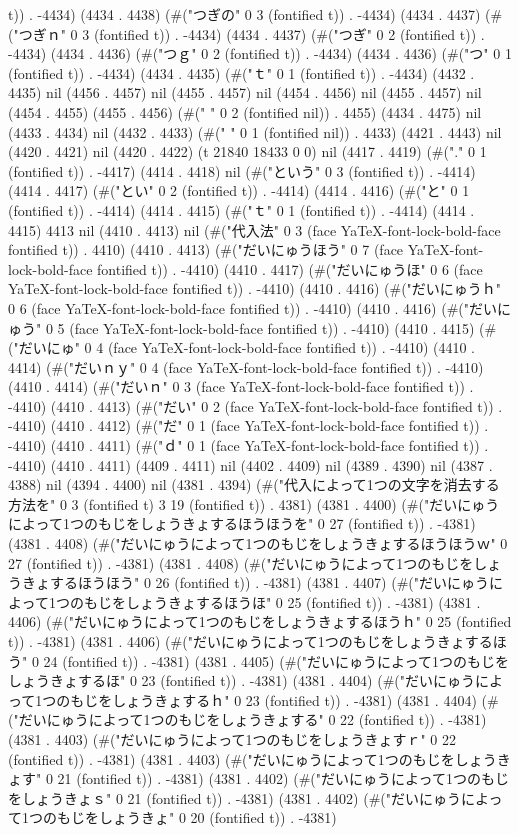 t)) . -4434) (4434 . 4438) (#("つぎの" 0 3 (fontified t)) . -4434) (4434 . 4437) (#("つぎｎ" 0 3 (fontified t)) . -4434) (4434 . 4437) (#("つぎ" 0 2 (fontified t)) . -4434) (4434 . 4436) (#("つｇ" 0 2 (fontified t)) . -4434) (4434 . 4436) (#("つ" 0 1 (fontified t)) . -4434) (4434 . 4435) (#("ｔ" 0 1 (fontified t)) . -4434) (4432 . 4435) nil (4456 . 4457) nil (4455 . 4457) nil (4454 . 4456) nil (4455 . 4457) nil (4454 . 4455) (4455 . 4456) (#("  " 0 2 (fontified nil)) . 4455) (4434 . 4475) nil (4433 . 4434) nil (4432 . 4433) (#(" " 0 1 (fontified nil)) . 4433) (4421 . 4443) nil (4420 . 4421) nil (4420 . 4422) (t 21840 18433 0 0) nil (4417 . 4419) (#("." 0 1 (fontified t)) . -4417) (4414 . 4418) nil (#("という" 0 3 (fontified t)) . -4414) (4414 . 4417) (#("とい" 0 2 (fontified t)) . -4414) (4414 . 4416) (#("と" 0 1 (fontified t)) . -4414) (4414 . 4415) (#("ｔ" 0 1 (fontified t)) . -4414) (4414 . 4415) 4413 nil (4410 . 4413) nil (#("代入法" 0 3 (face YaTeX-font-lock-bold-face fontified t)) . 4410) (4410 . 4413) (#("だいにゅうほう" 0 7 (face YaTeX-font-lock-bold-face fontified t)) . -4410) (4410 . 4417) (#("だいにゅうほ" 0 6 (face YaTeX-font-lock-bold-face fontified t)) . -4410) (4410 . 4416) (#("だいにゅうｈ" 0 6 (face YaTeX-font-lock-bold-face fontified t)) . -4410) (4410 . 4416) (#("だいにゅう" 0 5 (face YaTeX-font-lock-bold-face fontified t)) . -4410) (4410 . 4415) (#("だいにゅ" 0 4 (face YaTeX-font-lock-bold-face fontified t)) . -4410) (4410 . 4414) (#("だいｎｙ" 0 4 (face YaTeX-font-lock-bold-face fontified t)) . -4410) (4410 . 4414) (#("だいｎ" 0 3 (face YaTeX-font-lock-bold-face fontified t)) . -4410) (4410 . 4413) (#("だい" 0 2 (face YaTeX-font-lock-bold-face fontified t)) . -4410) (4410 . 4412) (#("だ" 0 1 (face YaTeX-font-lock-bold-face fontified t)) . -4410) (4410 . 4411) (#("ｄ" 0 1 (face YaTeX-font-lock-bold-face fontified t)) . -4410) (4410 . 4411) (4409 . 4411) nil (4402 . 4409) nil (4389 . 4390) nil (4387 . 4388) nil (4394 . 4400) nil (4381 . 4394) (#("代入によって1つの文字を消去する方法を" 0 3 (fontified t) 3 19 (fontified t)) . 4381) (4381 . 4400) (#("だいにゅうによって1つのもじをしょうきょするほうほうを" 0 27 (fontified t)) . -4381) (4381 . 4408) (#("だいにゅうによって1つのもじをしょうきょするほうほうｗ" 0 27 (fontified t)) . -4381) (4381 . 4408) (#("だいにゅうによって1つのもじをしょうきょするほうほう" 0 26 (fontified t)) . -4381) (4381 . 4407) (#("だいにゅうによって1つのもじをしょうきょするほうほ" 0 25 (fontified t)) . -4381) (4381 . 4406) (#("だいにゅうによって1つのもじをしょうきょするほうｈ" 0 25 (fontified t)) . -4381) (4381 . 4406) (#("だいにゅうによって1つのもじをしょうきょするほう" 0 24 (fontified t)) . -4381) (4381 . 4405) (#("だいにゅうによって1つのもじをしょうきょするほ" 0 23 (fontified t)) . -4381) (4381 . 4404) (#("だいにゅうによって1つのもじをしょうきょするｈ" 0 23 (fontified t)) . -4381) (4381 . 4404) (#("だいにゅうによって1つのもじをしょうきょする" 0 22 (fontified t)) . -4381) (4381 . 4403) (#("だいにゅうによって1つのもじをしょうきょすｒ" 0 22 (fontified t)) . -4381) (4381 . 4403) (#("だいにゅうによって1つのもじをしょうきょす" 0 21 (fontified t)) . -4381) (4381 . 4402) (#("だいにゅうによって1つのもじをしょうきょｓ" 0 21 (fontified t)) . -4381) (4381 . 4402) (#("だいにゅうによって1つのもじをしょうきょ" 0 20 (fontified t)) . -4381) 